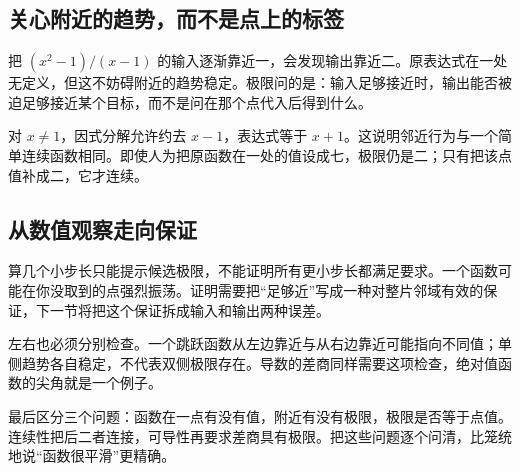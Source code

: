 \subsection*{关心附近的趋势，而不是点上的标签}
把 $(x^2-1)/(x-1)$ 的输入逐渐靠近一，会发现输出靠近二。原表达式在一处无定义，但这不妨碍附近的趋势稳定。极限问的是：输入足够接近时，输出能否被迫足够接近某个目标，而不是问在那个点代入后得到什么。

对 $x\ne1$，因式分解允许约去 $x-1$，表达式等于 $x+1$。这说明邻近行为与一个简单连续函数相同。即使人为把原函数在一处的值设成七，极限仍是二；只有把该点值补成二，它才连续。

\subsection*{从数值观察走向保证}
算几个小步长只能提示候选极限，不能证明所有更小步长都满足要求。一个函数可能在你没取到的点强烈振荡。证明需要把“足够近”写成一种对整片邻域有效的保证，下一节将把这个保证拆成输入和输出两种误差。

左右也必须分别检查。一个跳跃函数从左边靠近与从右边靠近可能指向不同值；单侧趋势各自稳定，不代表双侧极限存在。导数的差商同样需要这项检查，绝对值函数的尖角就是一个例子。

最后区分三个问题：函数在一点有没有值，附近有没有极限，极限是否等于点值。连续性把后二者连接，可导性再要求差商具有极限。把这些问题逐个问清，比笼统地说“函数很平滑”更精确。

